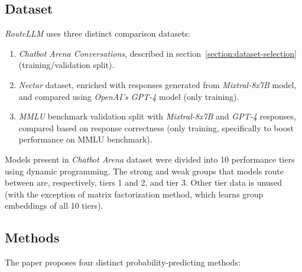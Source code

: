 \documentclass[a4paper,11pt,twoside]{report}
\theoremstyle{definition}
\begin{document}
\subsection{Dataset}
\label{section:routellm-datasets}

\textit{RouteLLM} uses three distinct comparison datasets:

\begin{enumerate}
    \item \textit{Chatbot Arena Conversations}, described in section~\ref{section:dataset-selection} (training/validation split).
    \item \textit{Nectar} dataset, enriched with responses generated from \textit{Mixtral-8x7B} model, and compared using \textit{OpenAI's GPT-4} model (only training).
    \item \textit{MMLU} benchmark validation split with \textit{Mixtral-8x7B} and \textit{GPT-4} responses, compared based on response correctness (only training, specifically to boost performance on MMLU benchmark). 
\end{enumerate}

Models present in \textit{Chatbot Arena} dataset were divided into 10 performance tiers using dynamic programming. The strong and weak groups that models route between are, respectively, tiers 1 and 2, and tier 3. Other tier data is unused (with the exception of matrix factorization method, which learns group embeddings of all 10 tiers).

\subsection{Methods}

The paper proposes four distinct probability-predicting methods:
\end{document}
